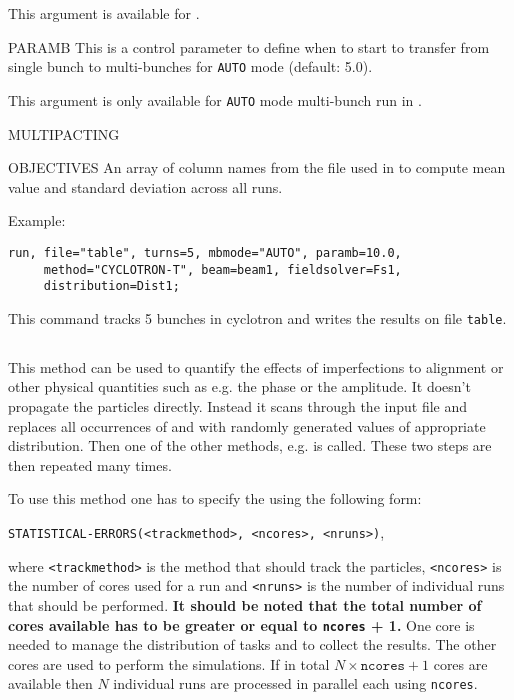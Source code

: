 \begin{kdescription}
  This argument is available for \opalcycl.

  \item[PARAMB]
   This is a control parameter to define when to start to transfer from single bunch to multi-bunches for \texttt{AUTO} mode (default: 5.0).

   This argument is only available for \texttt{AUTO} mode multi-bunch run in \opalcycl.

   \item[MULTIPACTING] 
   \item[OBJECTIVES] An array of column names from the  file used in  to compute mean value and standard deviation across all runs.
\end{kdescription}
Example:
\begin{verbatim}
run, file="table", turns=5, mbmode="AUTO", paramb=10.0,
     method="CYCLOTRON-T", beam=beam1, fieldsolver=Fs1,
     distribution=Dist1;
\end{verbatim}

This command tracks 5 bunches in cyclotron and writes the results on file \texttt{table}.

\subsection{}
\label{ssec:statistical-errors}
This method can be used to quantify the effects of imperfections to alignment or other physical quantities such as e.g. the phase or the amplitude. It doesn't propagate the particles directly. Instead it scans through the input file and replaces all occurrences of  and  with randomly generated values of appropriate distribution. Then one of the other methods, e.g.  is called. These two steps are then repeated many times.

To use this method one has to specify the  using the following form:
\begin{center}
\texttt{STATISTICAL-ERRORS(<track{\textunderscore}method>, <ncores>, <nruns>)},
\end{center}
\noindent where \texttt{<track{\textunderscore}method>} is the method that should track the particles, \texttt{<ncores>} is the number of cores used for a run and \texttt{<nruns>} is the number of individual runs that should be performed. \textbf{It should be noted that the total number of cores available has to be greater or equal to \texttt{ncores} + 1.} One core is needed to manage the distribution of tasks and to collect the results. The other cores are used to perform the simulations. If in total $N \times \texttt{ncores} + 1$ cores are available then $N$ individual runs are processed in parallel each using \texttt{ncores}.

